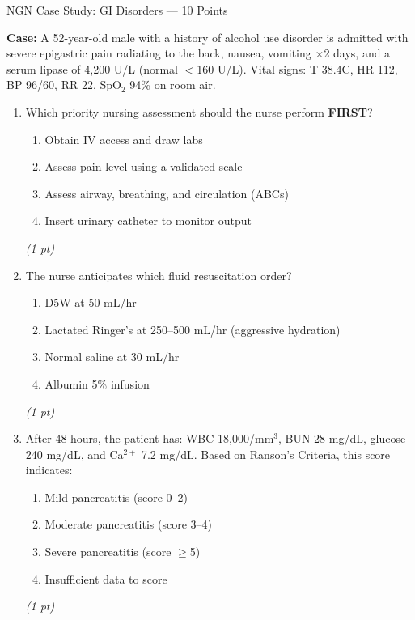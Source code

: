 \documentclass[11pt,letterpaper]{article}
\begin{document}
\begin{diagbox}{NGN Case Study: GI Disorders --- 10 Points}

\noindent\textbf{Case:} A 52-year-old male with a history of alcohol use disorder is admitted
with severe epigastric pain radiating to the back, nausea, vomiting $\times$2 days, and a
serum lipase of 4{,}200 U/L (normal $<$160 U/L).  Vital signs: T 38.4\textdegree C,
HR 112, BP 96/60, RR 22, SpO$_2$ 94\% on room air.

\begin{enumerate}[leftmargin=1.5em, label=\textbf{\arabic*.},start=61]

  \item Which priority nursing assessment should the nurse perform \textbf{FIRST}?
        \begin{enumerate}[label=$\bigcirc$]
          \item Obtain IV access and draw labs
          \item Assess pain level using a validated scale
          \item Assess airway, breathing, and circulation (ABCs)
          \item Insert urinary catheter to monitor output
        \end{enumerate}
        \hfill\textit{(1 pt)}

  \item The nurse anticipates which fluid resuscitation order?
        \begin{enumerate}[label=$\bigcirc$]
          \item D5W at 50 mL/hr
          \item Lactated Ringer's at 250--500 mL/hr (aggressive hydration)
          \item Normal saline at 30 mL/hr
          \item Albumin 5\% infusion
        \end{enumerate}
        \hfill\textit{(1 pt)}

  \item After 48 hours, the patient has: WBC 18{,}000/mm$^3$, BUN 28 mg/dL,
        glucose 240 mg/dL, and Ca$^{2+}$ 7.2 mg/dL.  Based on Ranson's Criteria,
        this score indicates:
        \begin{enumerate}[label=$\bigcirc$]
          \item Mild pancreatitis (score 0--2)
          \item Moderate pancreatitis (score 3--4)
          \item Severe pancreatitis (score $\geq$5)
          \item Insufficient data to score
        \end{enumerate}
        \hfill\textit{(1 pt)}


\end{enumerate}
\end{diagbox}
\end{document}
